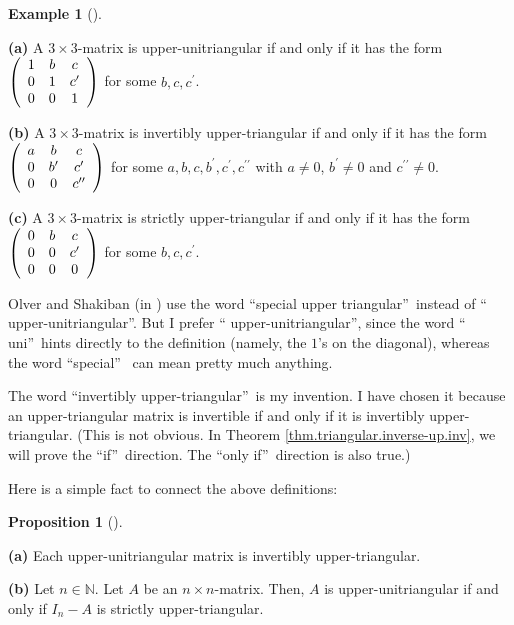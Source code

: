 \documentclass[numbers=enddot,12pt,final,onecolumn,notitlepage]{scrartcl}%
\theoremstyle{definition}
\newtheorem{prop}[theo]{Proposition}
\newenvironment{proposition}[1][]
{\begin{prop}[#1]\begin{leftbar}}
{\end{leftbar}\end{prop}}
\newtheorem{exam}[theo]{Example}
\newenvironment{example}[1][]
{\begin{exam}[#1]\begin{leftbar}}
{\end{leftbar}\end{exam}}
\begin{document}
\begin{example}
\textbf{(a)} A $3\times3$-matrix is upper-unitriangular if and only if it has
the form $\left(
\begin{array}
[c]{ccc}%
1 & b & c\\
0 & 1 & c^{\prime}\\
0 & 0 & 1
\end{array}
\right)  $ for some $b,c,c^{\prime}$.

\textbf{(b)} A $3\times3$-matrix is invertibly upper-triangular if and only if
it has the form $\left(
\begin{array}
[c]{ccc}%
a & b & c\\
0 & b^{\prime} & c^{\prime}\\
0 & 0 & c^{\prime\prime}%
\end{array}
\right)  $ for some $a,b,c,b^{\prime},c^{\prime},c^{\prime\prime}$ with
$a\neq0$, $b^{\prime}\neq0$ and $c^{\prime\prime}\neq0$.

\textbf{(c)} A $3\times3$-matrix is strictly upper-triangular if and only if
it has the form $\left(
\begin{array}
[c]{ccc}%
0 & b & c\\
0 & 0 & c^{\prime}\\
0 & 0 & 0
\end{array}
\right)  $ for some $b,c,c^{\prime}$.
\end{example}

Olver and Shakiban (in \cite{OlvSha06}) use the word \textquotedblleft special
upper triangular\textquotedblright\ instead of \textquotedblleft
upper-unitriangular\textquotedblright. But I prefer \textquotedblleft
upper-unitriangular\textquotedblright, since the word \textquotedblleft
uni\textquotedblright\ hints directly to the definition (namely, the $1$'s on
the diagonal), whereas the word \textquotedblleft special\textquotedblright%
\ can mean pretty much anything.

The word \textquotedblleft invertibly upper-triangular\textquotedblright\ is
my invention. I have chosen it because an upper-triangular matrix is
invertible if and only if it is invertibly upper-triangular. (This is not
obvious. In Theorem \ref{thm.triangular.inverse-up.inv}, we will prove the
\textquotedblleft if\textquotedblright\ direction. The \textquotedblleft only
if\textquotedblright\ direction is also true.)

Here is a simple fact to connect the above definitions:

\begin{proposition}
\label{prop.triangular.uni-inv}\textbf{(a)} Each upper-unitriangular matrix is
invertibly upper-triangular.

\textbf{(b)} Let $n \in\mathbb{N}$. Let $A$ be an $n \times n$-matrix. Then,
$A$ is upper-unitriangular if and only if $I_{n} - A$ is strictly upper-triangular.
\end{proposition}
\end{document}
